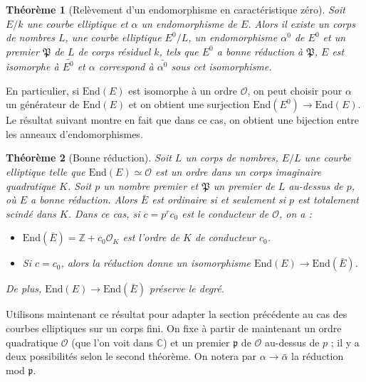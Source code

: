 \documentclass[11pt,a4paper]{article}
\newcommand{\Z}{\mathbb{Z}}
\newcommand{\C}{\mathbb{C}}
\renewcommand{\O}{\mathcal{O}}
\newcommand{\vers}{\longrightarrow}
\newcommand{\End}{\mathrm{End}}
\renewcommand{\frak}{\mathfrak}
\newtheorem*{thm}{Théorème}
\theoremstyle{definition}
\begin{document}
\begin{thm}[Relèvement d'un endomorphisme en caractéristique zéro]

Soit $E/k$ une courbe elliptique et $\alpha$ un endomorphisme de $E$. Alors il existe un corps de nombres $L$, une courbe elliptique $E^0/L$, un endomorphisme $\alpha^0$ de $E^0$ et un premier $\frak P$ de $L$ de corps résiduel $k$, tels que $E^0$ a bonne réduction à $\frak P$, $E$ est isomorphe à $\bar{E^0}$ et $\alpha$ correspond à $\bar{\alpha^0}$ sous cet isomorphisme.

\end{thm}

En particulier, si $\End(E)$ est isomorphe à un ordre $\O$, on peut choisir pour $\alpha$ un générateur de $\End(E)$ et on obtient une surjection $\End(E^0)\vers \End(E).$ Le résultat suivant montre en fait que dans ce cas, on obtient une bijection entre les anneaux d'endomorphismes.

\begin{thm}[Bonne réduction]

Soit $L$ un corps de nombres, $E/L$ une courbe elliptique telle que $\End(E)\simeq \O$ est un ordre dans un corps imaginaire quadratique $K$. Soit $p$ un nombre premier et $\frak P$ un premier de $L$ au-dessus de $p$, où $E$ a bonne réduction. Alors $\bar{E}$ est ordinaire si et seulement si $p$ est totalement scindé dans $K$. Dans ce cas, si $c=p^r c_0$ est le conducteur de $\O$, on a :

\begin{itemize}
\item[(i)] $\End(\bar{E})=\Z+c_0 \O_K$ est l'ordre de $K$ de conducteur $c_0$.
\item[(ii)] Si $c=c_0$, alors la réduction donne un isomorphisme $\End(E)\vers\End(\bar{E})$.
\end{itemize}

De plus, $\End(E)\vers\End(\bar{E})$ préserve le degré.

\end{thm}

Utilisons maintenant ce résultat pour adapter la section précédente au cas des courbes elliptiques sur un corps fini. On fixe à partir de maintenant un ordre quadratique $\O$ (que l'on voit dans $\C$) et un premier $\frak p$ de $\O$ au-dessus de $p$ ; il y a deux possibilités selon le second théorème. On notera par $\alpha\vers\bar{\alpha}$ la réduction mod $\frak p$.
\end{document}
